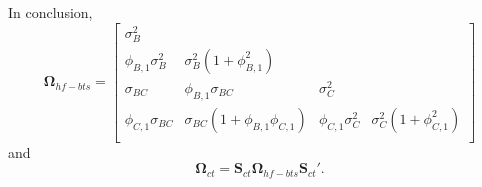 \documentclass[a4paper,11pt]{article}
\newcommand{\Svet}{\bm{S}}
\newcommand{\Omegavet}{\bm{\Omega}}
\theoremstyle{definition}
\begin{document}
In conclusion,
$$
	\Omegavet_{hf-bts} = \begin{bmatrix}
		\sigma^2_B            &                                                 &                      &                                       \\
		\phi_{B,1}\sigma_B^2  & \sigma_B^2\left(1+\phi_{B,1}^2\right)           &                      &                                       \\
		\sigma_{BC}           & \phi_{B,1}\sigma_{BC}                           & \sigma_C^2           &                                       \\
		\phi_{C,1}\sigma_{BC} & \sigma_{BC}\left(1+\phi_{B,1}\phi_{C,1} \right) & \phi_{C,1}\sigma_C^2 & \sigma_C^2\left(1+\phi_{C,1}^2\right) \\
	\end{bmatrix}
$$
and
$$
	\Omegavet_{ct} = \Svet_{ct}\Omegavet_{hf-bts}\Svet_{ct}'.
$$

\newpage
\end{document}
